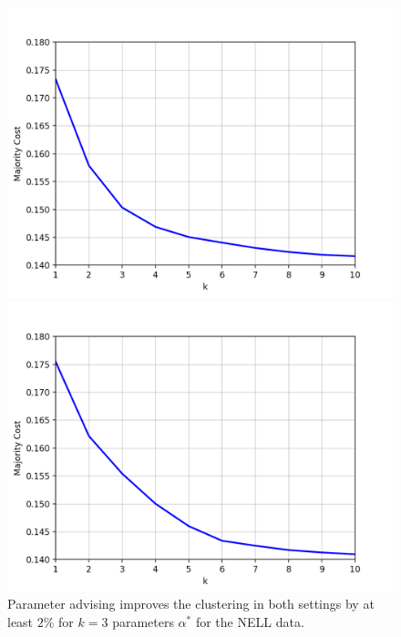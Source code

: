 \begin{figure}[h]
\centering
\begin{minipage}{.45\textwidth}
  \centering
  \includegraphics[width=\linewidth]{plots/nell_sc_1000_top10}
\end{minipage}
\begin{minipage}{.45\textwidth}
  \centering
  \includegraphics[width=\linewidth]{plots/nell_ac_1000_top10}
\end{minipage}
\caption{Parameter advising improves the clustering in both settings by at least $2\%$ for $k = 3$ parameters $\alpha^*$ for the NELL data.} 
\label{fig:nell1000top10}
\end{figure}

